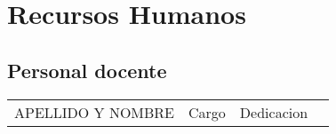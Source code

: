 \documentclass[a4paper, 12pt]{article}
\begin{document}
\section{Recursos Humanos}


\subsection{Personal docente}

\begin{xltabular}{1\textwidth}{|l|l|l|l|} \hline  
   \\ \hline

APELLIDO Y NOMBRE&Cargo&Dedicacion\\ \hline
\hline


\end{xltabular}
\end{document}
